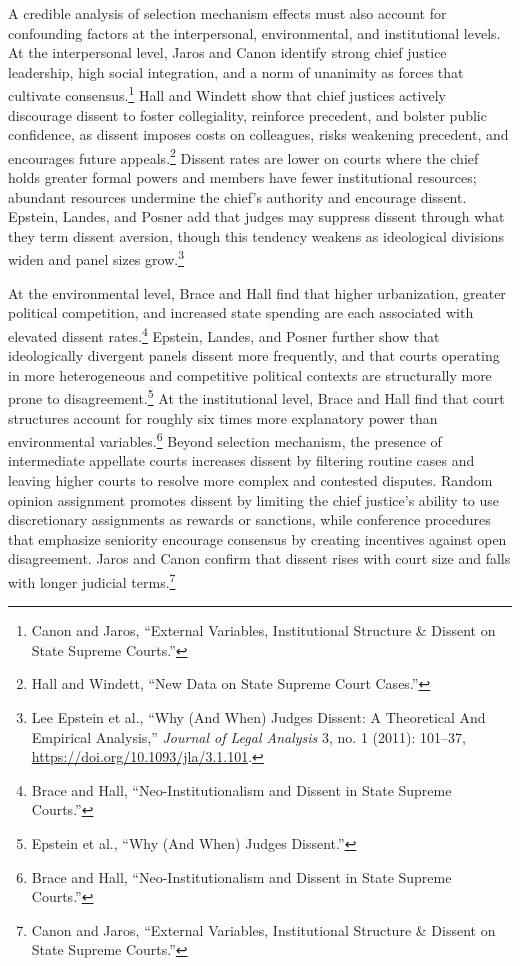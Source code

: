 A credible analysis of selection mechanism effects must also account for
confounding factors at the interpersonal, environmental, and
institutional levels. At the interpersonal level, Jaros and Canon
identify strong chief justice leadership, high social integration, and a
norm of unanimity as forces that cultivate consensus.\footnote{Canon and
  Jaros, {``External {Variables}, {Institutional Structure} \& {Dissent}
  on {State Supreme Courts}.''}} Hall and Windett show that chief
justices actively discourage dissent to foster collegiality, reinforce
precedent, and bolster public confidence, as dissent imposes costs on
colleagues, risks weakening precedent, and encourages future
appeals.\footnote{Hall and Windett, {``New {Data} on {State Supreme
  Court Cases}.''}} Dissent rates are lower on courts where the chief
holds greater formal powers and members have fewer institutional
resources; abundant resources undermine the chief's authority and
encourage dissent. Epstein, Landes, and Posner add that judges may
suppress dissent through what they term dissent aversion, though this
tendency weakens as ideological divisions widen and panel sizes
grow.\footnote{Lee Epstein et al., {``Why ({And When}) {Judges Dissent}:
  {A Theoretical And Empirical Analysis},''} \emph{Journal of Legal
  Analysis} 3, no. 1 (2011): 101--37,
  \url{https://doi.org/10.1093/jla/3.1.101}.}

At the environmental level, Brace and Hall find that higher
urbanization, greater political competition, and increased state
spending are each associated with elevated dissent rates.\footnote{Brace
  and Hall, {``Neo-{Institutionalism} and {Dissent} in {State Supreme
  Courts}.''}} Epstein, Landes, and Posner further show that
ideologically divergent panels dissent more frequently, and that courts
operating in more heterogeneous and competitive political contexts are
structurally more prone to disagreement.\footnote{Epstein et al., {``Why
  ({And When}) {Judges Dissent}.''}} At the institutional level, Brace
and Hall find that court structures account for roughly six times more
explanatory power than environmental variables.\footnote{Brace and Hall,
  {``Neo-{Institutionalism} and {Dissent} in {State Supreme Courts}.''}}
Beyond selection mechanism, the presence of intermediate appellate
courts increases dissent by filtering routine cases and leaving higher
courts to resolve more complex and contested disputes. Random opinion
assignment promotes dissent by limiting the chief justice's ability to
use discretionary assignments as rewards or sanctions, while conference
procedures that emphasize seniority encourage consensus by creating
incentives against open disagreement. Jaros and Canon confirm that
dissent rises with court size and falls with longer judicial
terms.\footnote{Canon and Jaros, {``External {Variables}, {Institutional
  Structure} \& {Dissent} on {State Supreme Courts}.''}}

